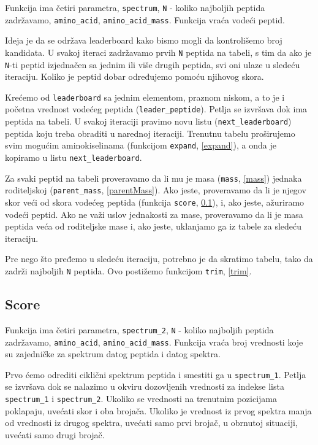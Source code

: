 Funkcija ima četiri parametra, \texttt{spectrum}, \texttt{N} - koliko najboljih peptida zadržavamo, \texttt{amino\_acid},  \texttt{amino\_acid\_mass}. Funkcija vraća vodeći peptid.

Ideja je da se održava leaderboard kako bismo mogli da kontrolišemo broj kandidata. U svakoj iteraci zadržavamo prvih \texttt{N} peptida na tabeli, s tim da ako je \texttt{N}-ti peptid izjednačen sa jednim ili više drugih peptida, svi oni ulaze u sledeću iteraciju. Koliko je peptid dobar određujemo pomoću njihovog skora.

Krećemo od \texttt{leaderboard} sa jednim elementom, praznom niskom, a to je i početna vrednost vodećeg peptida (\texttt{leader\_peptide}). Petlja se izvršava dok ima peptida na tabeli. U svakoj iteraciji pravimo novu listu (\texttt{next\_leaderboard}) peptida koju treba obraditi u narednoj iteraciji. Trenutnu tabelu proširujemo svim mogućim aminokiselinama (funkcijom \texttt{expand}, \ref{expand}), a onda je kopiramo u listu \texttt{next\_leaderboard}. 

Za svaki peptid na tabeli proveravamo da li mu je masa (\texttt{mass}, \ref{mass}) jednaka roditeljskoj (\texttt{parent\_mass}, \ref{parentMass}). Ako jeste, proveravamo da li je njegov skor veći od skora vodećeg peptida (funkcija \texttt{score}, \ref{scoreCycle}), i, ako jeste, ažuriramo vodeći peptid. Ako ne važi uslov jednakosti za mase, proveravamo da li je masa peptida veća od roditeljske mase i, ako jeste, uklanjamo ga iz tabele za sledeću iteraciju.

Pre nego što pređemo u sledeću iteraciju, potrebno je da skratimo tabelu, tako da zadrži najboljih \texttt{N} peptida. Ovo postižemo funkcijom \texttt{trim}, \ref{trim}.




\subsection{Score}
\label{scoreCycle} 

Funkcija ima četiri parametra, \texttt{spectrum\_2}, \texttt{N} - koliko najboljih peptida zadržavamo, \texttt{amino\_acid},  \texttt{amino\_acid\_mass}. Funkcija vraća broj vrednosti koje su zajedničke za spektrum datog peptida i datog spektra.

Prvo ćemo odrediti ciklični spektrum peptida i smestiti ga u \texttt{spectrum\_1}. Petlja se izvršava dok se nalazimo u okviru dozovljenih vrednosti za indekse lista \texttt{spectrum\_1} i \texttt{spectrum\_2}. Ukoliko se vrednosti na trenutnim pozicijama poklapaju, uvećati skor i oba brojača. Ukoliko je vrednost iz prvog spektra manja od vrednosti iz drugog spektra, uvećati samo prvi brojač, u obrnutoj situaciji, uvećati samo drugi brojač.


